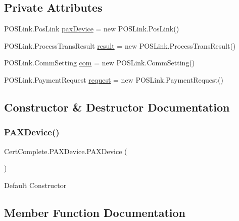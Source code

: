 \subsection*{Private Attributes}
\begin{DoxyCompactItemize}
\item 
P\+O\+S\+Link.\+Pos\+Link \mbox{\hyperlink{class_cert_complete_1_1_p_a_x_device_a4100c53ceec220b6148ce00412775bcc}{pax\+Device}} = new P\+O\+S\+Link.\+Pos\+Link()
\item 
P\+O\+S\+Link.\+Process\+Trans\+Result \mbox{\hyperlink{class_cert_complete_1_1_p_a_x_device_a71de9bbbc884a048ba0a7c99a423325c}{result}} = new P\+O\+S\+Link.\+Process\+Trans\+Result()
\item 
P\+O\+S\+Link.\+Comm\+Setting \mbox{\hyperlink{class_cert_complete_1_1_p_a_x_device_ae0fd2ac9f3d111a94efdf3415dcd63c7}{com}} = new P\+O\+S\+Link.\+Comm\+Setting()
\item 
P\+O\+S\+Link.\+Payment\+Request \mbox{\hyperlink{class_cert_complete_1_1_p_a_x_device_a101e6e34494845a82d2834c79fce5554}{request}} = new P\+O\+S\+Link.\+Payment\+Request()
\end{DoxyCompactItemize}


\subsection{Constructor \& Destructor Documentation}
\mbox{\label{class_cert_complete_1_1_p_a_x_device_aae9ac50b3ddf02d37aac79c78015d005}} 
\subsubsection{\texorpdfstring{P\+A\+X\+Device()}{PAXDevice()}}
{\footnotesize\ttfamily Cert\+Complete.\+P\+A\+X\+Device.\+P\+A\+X\+Device (\begin{DoxyParamCaption}{ }\end{DoxyParamCaption})\hspace{0.3cm}{\ttfamily [inline]}}



Default Constructor 



\subsection{Member Function Documentation}
\mbox{\label{class_cert_complete_1_1_p_a_x_device_a10e0f2fea2074b0dc4220b454c88c503}} 
